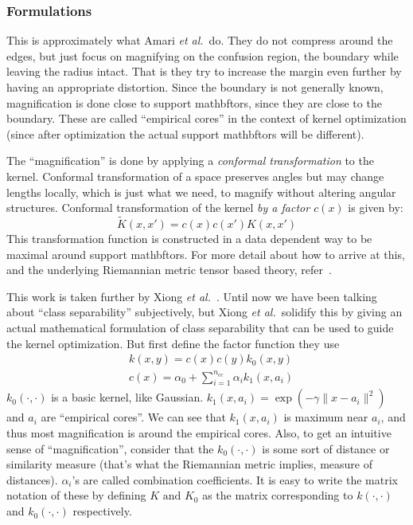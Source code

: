\documentclass[11pt]{article}
\newcommand{\etal}{{\em et al.}}
\begin{document}
\subsubsection{Formulations}
This is approximately what Amari \etal\ do. They do not compress around the
edges, but just focus on magnifying on the confusion region, the boundary while
leaving the radius intact. That
is they try to increase the margin even further by having an appropriate
distortion. Since the boundary is not generally known, magnification is done
close to support mathbftors, since they are close to the boundary. These are called
``empirical cores'' in the context of kernel optimization (since after
optimization the actual support mathbftors will be different).\par
The ``magnification'' is done by applying a {\em conformal transformation} to
the kernel. Conformal transformation of a space preserves angles but may
change lengths locally, which is just what we need, to magnify without altering
angular structures. Conformal transformation of the kernel \textit{by a factor
$c(x)$} is given by:
\[\tilde{K}(x,x')=c(x)c(x')K(x,x')\]
This transformation function is constructed in a data dependent way to be
maximal around support mathbftors. For more detail about how to arrive at this, and
the underlying Riemannian metric tensor based theory, refer~\cite{amari}.\par
This work is taken further by Xiong \etal~\cite{xiong}. Until now we have been
talking about ``class separability'' subjectively, but Xiong \etal\ solidify
this by giving an actual mathematical formulation of class separability that can
be used to guide the kernel optimization. But first define the factor function
they use
\begin{align*}
    &k(x,y)=c(x)c(y)k_0(x,y)\\
    &c(x)=\alpha_0+\sum_{i=1}^{n_{ec}}\alpha_ik_1(x,a_i)
\end{align*}
$k_0(\cdot,\cdot)$ is a basic kernel, like Gaussian.
$k_1(x,a_i)=\exp(-\gamma\lVert x-a_i\rVert^2)$ and $a_i$ are ``empirical
cores''. We can see that $k_1(x,a_i)$ is maximum near $a_i$, and thus most
magnification is around the empirical cores. Also, to get an intuitive sense of
``magnification'', consider that the $k_0(\cdot,\cdot)$ is some sort of distance
or similarity measure (that's what the Riemannian metric implies, measure of
distances). $\alpha_i$'s are called combination coefficients. It is easy to write
the matrix notation of these by defining $K\text{ and }K_0$ as the matrix
corresponding to $k(\cdot,\cdot)$ and $k_0(\cdot,\cdot)$ respectively.
\end{document}
